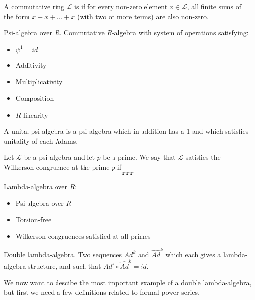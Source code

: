 \begin{definition}
A commutative ring $\mathcal{L}$ is  if for every non-zero element $x \in \mathcal{L}$, all finite sums of the form $x+x+ \ldots +x$ (with two or more terms) are also non-zero.
\end{definition}

\begin{definition}
Psi-algebra over $R$. Commutative $R$-algebra with system of operations satisfying:
\begin{itemize}
\item $\psi^1 = id$
\item Additivity
\item Multiplicativity
\item Composition
\item $R$-linearity
\end{itemize}
A unital psi-algebra is a psi-algebra which in addition has a 1 and which satisfies unitality of each Adams.
\end{definition}


\begin{definition}
Let $\mathcal{L}$ be a psi-algebra and let $p$ be a prime. We say that $\mathcal{L}$ satisfies the Wilkerson congruence at the prime $p$ if
$$   xxx   $$
\end{definition}

\begin{definition}
Lambda-algebra over $R$:
\begin{itemize}
\item Psi-algebra over $R$
\item Torsion-free
\item Wilkerson congruences satisfied at all primes

\end{itemize}
\end{definition}

 

\begin{definition}
Double lambda-algebra. Two sequences $Ad^k$ and $\widehat{Ad}^k$ which each gives a lambda-algebra structure, and such that $Ad^k \circ \widehat{Ad}^k = id$.
\end{definition}

We now want to descibe the most important example of a double lambda-algebra, but first we need a few definitions related to formal power series.



